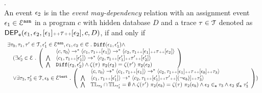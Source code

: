 \begin{defn}.
\label{def:event_dep}
\\ 
  An event $\mathtt{\epsilon}_2$ is in the \emph{event may-dependency} relation with an assignment
  event $\mathtt{\epsilon}_1 \in \mathcal{E}^{\mathtt{{asn}}}$ in a program ${c}$
  with hidden database $D$ and a trace $\mathtt{\tau} \in \mathcal{T}$ denoted as 
  $\mathsf{DEP_{\mathtt{e}}}(\mathtt{\epsilon}_1, \mathtt{\epsilon}_2, [\mathtt{\epsilon}_1 ] {\scriptscriptstyle ++} \mathtt{\tau} {\scriptscriptstyle ++} [\mathtt{\epsilon}_2], c, D)$, if and only if
  \[
    \begin{array}{l}
  \exists \vtrace_0,
  \vtrace_1, \vtrace' \in \mathcal{T},\event_1' \in \eventset^{\asn}, {c}_1, {c}_2  \in \cdom  \st
  \diff(\event_1, \event_1') \land 
      \\ \quad
      (
        \exists  \event_2' \in \eventset \st 
    \left(
    \begin{array}{ll}   
   & \config{{c}, \vtrace_0} \rightarrow^{*} 
  \config{{c}_1, \vtrace_1 \tracecat [\event_1]}  \rightarrow^{*} 
    \config{{c}_2,  \vtrace_1 \tracecat [\event_1] \tracecat \vtrace \tracecat [\event_2] } 
   \\ 
   \bigwedge &
    \config{{c}_1, \vtrace_1 \tracecat [\event_1']}  \rightarrow^{*} 
    \config{{c}_2,  \vtrace_1 \tracecat[ \event_1'] \tracecat \vtrace' \tracecat [\event_2'] } 
  \\
  \bigwedge & 
  \diff(\event_2,\event_2' ) \land 
  \vcounter(\vtrace) ~ \pi_2(\event_2)
  = 
  \vcounter(\vtrace') ~ \pi_2(\event_2)\\
  \end{array}
  \right)
  \\ \quad
  \lor 
  \exists \vtrace_3, \vtrace_3'  \in \mathcal{T}, \event_b \in \eventset^{\test} \st 
  \left(
  \begin{array}{ll}   
    & \config{{c}, \vtrace_0} \rightarrow^{*} 
      \config{{c}_1, \vtrace_1 \tracecat [\event_1]}  \rightarrow^{*} 
      \config{c_2,  \vtrace_1 \tracecat [\event_1] \tracecat \trace \tracecat [\event_b] \tracecat  \trace_3} 
    \\ 
    \bigwedge &
    \config{{c}_1, \vtrace_1 \tracecat [\event_1']}  \rightarrow^{*} 
    \config{c_2,  \vtrace_1 \tracecat [\event_1'] \tracecat \trace' \tracecat [(\neg \event_b)] \tracecat \trace_3'} 
    \\
    \bigwedge &  \tlabel_{\trace_3} \cap \tlabel_{\trace_3'} = \emptyset
     \land \vcounter(\trace') ~  \pi_2(\event_b) = \vcounter(\trace) ~  \pi_2(\event_b)
      \land \event_2 \eventin \trace_3
    \land \event_2 \not\eventin \trace_3'
  \end{array}
  \right)
  )
\end{array}
   \]
%
\end{defn}
%

